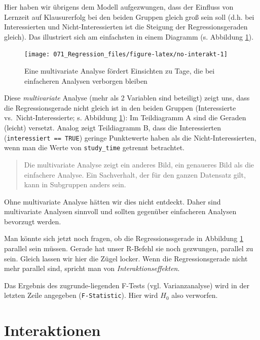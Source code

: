 \documentclass[12pt,ngerman,]{book}
\theoremstyle{definition}
\theoremstyle{definition}
\theoremstyle{remark}
\begin{document}
Hier haben wir übrigens dem Modell aufgezwungen, dass der Einfluss von
Lernzeit auf Klausurerfolg bei den beiden Gruppen gleich groß sein soll
(d.h. bei Interessierten und Nicht-Interessierten ist die Steigung der
Regressionsgeraden gleich). Das illustriert sich am einfachsten in einem
Diagramm (s. Abbildung \ref{fig:no-interakt}).

\begin{figure}

{\centering \texttt{[image: 071\_Regression\_files/figure-latex/no-interakt-1]} 

}

\caption{Eine multivariate Analyse fördert Einsichten zu Tage, die bei einfacheren Analysen verborgen bleiben}\label{fig:no-interakt}
\end{figure}

Diese \emph{multivariate} Analyse (mehr als 2
Variablen sind beteiligt) zeigt uns, dass die Regressionsgerade nicht
gleich ist in den beiden Gruppen (Interessierte vs.~Nicht-Interessierte;
s. Abbildung \ref{fig:no-interakt}): Im Teildiagramm A sind die Geraden
(leicht) versetzt. Analog zeigt Teildiagramm B, dass die Interessierten
(\texttt{interessiert\ ==\ TRUE}) geringe Punktewerte haben als die
Nicht-Interessierten, wenn man die Werte von \texttt{study\_time}
getrennt betrachtet.

\begin{quote}
Die multivariate Analyse zeigt ein anderes Bild, ein genaueres Bild als
die einfachere Analyse. Ein Sachverhalt, der für den ganzen Datensatz
gilt, kann in Subgruppen anders sein.
\end{quote}

Ohne multivariate Analyse hätten wir dies nicht entdeckt. Daher sind
multivariate Analysen sinnvoll und sollten gegenüber einfacheren
Analysen bevorzugt werden.

Man könnte sich jetzt noch fragen, ob die Regressionssgerade in
Abbildung \ref{fig:no-interakt} parallel sein müssen. Gerade hat unser
R-Befehl sie noch gezwungen, parallel zu sein. Gleich lassen wir hier
die Zügel locker. Wenn die Regressionsgerade nicht mehr parallel sind,
spricht man von \emph{Interaktionseffekten}.

Das Ergebnis des zugrunde-liegenden F-Tests (vgl. Varianzanalyse) wird
in der letzten Zeile angegeben (\texttt{F-Statistic}). Hier wird \(H_0\)
also verworfen.

\section{Interaktionen}\label{interaktionen}
\end{document}

